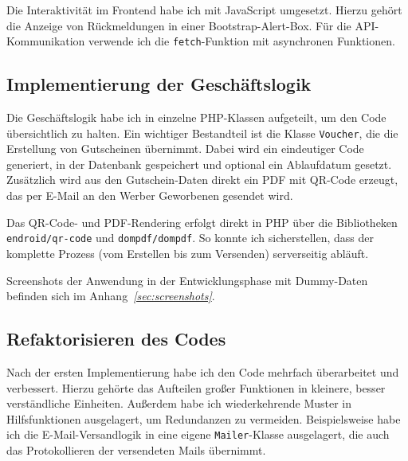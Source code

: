 

Die Interaktivität im Frontend habe ich mit JavaScript umgesetzt. 
Hierzu gehört \zB die Anzeige von Rückmeldungen in einer Bootstrap-Alert-Box.
Für die API-Kommunikation verwende ich die \texttt{fetch}-Funktion mit asynchronen Funktionen.



\cleardoublepage

\subsection{Implementierung der Geschäftslogik}
\label{sec:ImplementierungGeschaeftslogik}

Die Geschäftslogik habe ich in einzelne PHP-Klassen aufgeteilt, um den Code übersichtlich zu halten.
Ein wichtiger Bestandteil ist die Klasse \texttt{Voucher}, die die Erstellung von Gutscheinen übernimmt.
Dabei wird ein eindeutiger Code generiert, in der Datenbank gespeichert und optional ein Ablaufdatum gesetzt.
Zusätzlich wird aus den Gutschein-Daten direkt ein PDF mit QR-Code erzeugt, das per E-Mail an den Werber \bzw Geworbenen gesendet wird.



Das QR-Code- und PDF-Rendering erfolgt direkt in PHP über die Bibliotheken \texttt{endroid/qr-code} und \texttt{dompdf/dompdf}.
So konnte ich sicherstellen, dass der komplette Prozess (vom Erstellen bis zum Versenden) serverseitig abläuft.

Screenshots der Anwendung in der Entwicklungsphase mit Dummy-Daten befinden sich im Anhang~\textit{\ref{sec:screenshots}}.

\subsection{Refaktorisieren des Codes}
\label{sec:RefaktorisierenDesCodes}
Nach der ersten Implementierung habe ich den Code mehrfach überarbeitet und verbessert.
Hierzu gehörte das Aufteilen großer Funktionen in kleinere, besser verständliche Einheiten.
Außerdem habe ich wiederkehrende Muster in Hilfsfunktionen ausgelagert, um Redundanzen zu vermeiden.
Beispielsweise habe ich die E-Mail-Versandlogik in eine eigene \texttt{Mailer}-Klasse ausgelagert, die auch das Protokollieren der versendeten Mails übernimmt.